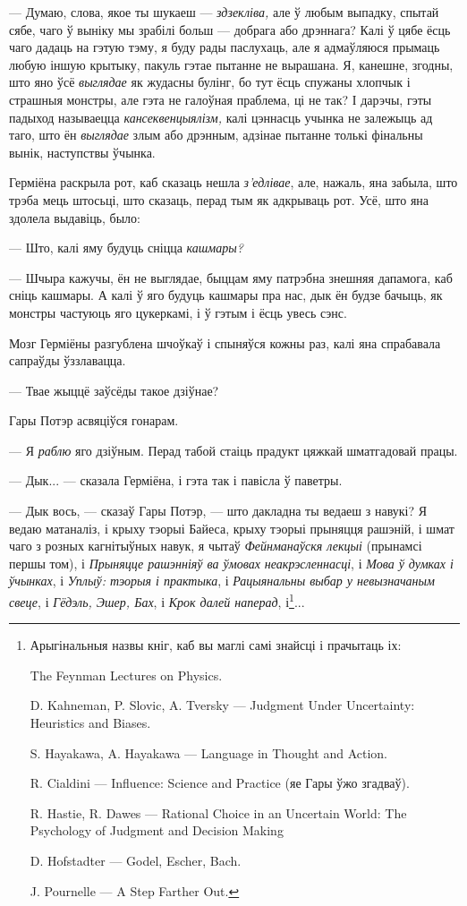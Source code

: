 --- Думаю, слова, якое ты шукаеш --- \emph{здзекліва,} але ў любым выпадку, 
спытай сябе, чаго ў выніку мы зрабілі больш --- добрага або дрэннага?  
Калі ў цябе ёсць чаго дадаць на гэтую тэму, я буду рады паслухаць, але 
я адмаўляюся прымаць любую іншую крытыку, пакуль гэтае пытанне не вырашана.
Я, канешне, згодны, што яно ўсё  \emph{выглядае} як жудасны булінг, 
бо тут ёсць спужаны хлопчык і страшныя монстры, але 
гэта не галоўная праблема, ці не так? І дарэчы, гэты падыход называецца
\emph{кансеквенцыялізм,} калі цэннасць учынка не залежыць ад таго, што ён 
\emph{выглядае} злым або дрэнным, адзінае пытанне толькі фінальны вынік, 
наступствы ўчынка.

Герміёна раскрыла рот, каб сказаць нешла \emph{з'едлівае}, але, нажаль, яна 
забыла, што трэба мець штосьці, што сказаць, перад тым як адкрываць рот. Усё, 
што яна здолела выдавіць, было:

--- Што, калі яму будуць сніцца \emph{кашмары?}

--- Шчыра кажучы, ён не выглядае, быццам яму патрэбна знешняя дапамога, каб 
сніць кашмары. А калі ў яго будуць кашмары пра нас, дык ён будзе бачыць, як 
монстры частуюць яго цукеркамі, і ў гэтым і ёсць увесь сэнс.

Мозг Герміёны разгублена шчоўкаў і спыняўся кожны раз, калі яна спрабавала 
сапраўды ўззлавацца. 

--- Твае жыццё заўсёды такое дзіўнае?

Гары Потэр асвяціўся гонарам.

--- Я \emph{раблю} яго дзіўным. Перад табой стаіць прадукт цяжкай шматгадовай працы.

--- Дык... --- сказала Герміёна, і гэта так і павісла ў паветры.

--- Дык вось, --- сказаў Гары Потэр, --- што дакладна ты ведаеш з навукі? Я 
ведаю матаналіз, і крыху тэорыі Байеса, крыху тэорыі прыняцця рашэній, 
і шмат чаго з розных кагнітыўных навук, я чытаў  \emph{Фейнманаўскя лекцыі}
(прынамсі першы том), і \emph{Прыняцце рашэнніяў ва ўмовах неакрэсленнасці}, 
і \emph{Мова ў думках і ўчынках}, 
і \emph{Уплыў: тэорыя і практыка}, 
і \emph{Рацыянальны выбар у невызначаным свеце}, 
і \emph{Гёдэль, Эшер, Бах}, 
і \emph{Крок далей наперад}, 
і\footnote{{} Арыгінальныя назвы кніг, каб вы маглі самі знайсці і прачытаць іх:
\par{}The Feynman Lectures on Physics.
\par{}D. Kahneman, P. Slovic, A. Tversky --- Judgment Under Uncertainty: Heuristics and Biases.
\par{}S. Hayakawa, A. Hayakawa  --- Language in Thought and Action.
\par{}R. Cialdini --- Influence: Science and Practice (яе Гары ўжо згадваў).
\par{}R. Hastie, R. Dawes --- Rational Choice in an Uncertain World: The Psychology of Judgment and Decision Making
\par{}D. Hofstadter --- Godel, Escher, Bach.
\par{}J. Pournelle --- A Step Farther Out.
}...

